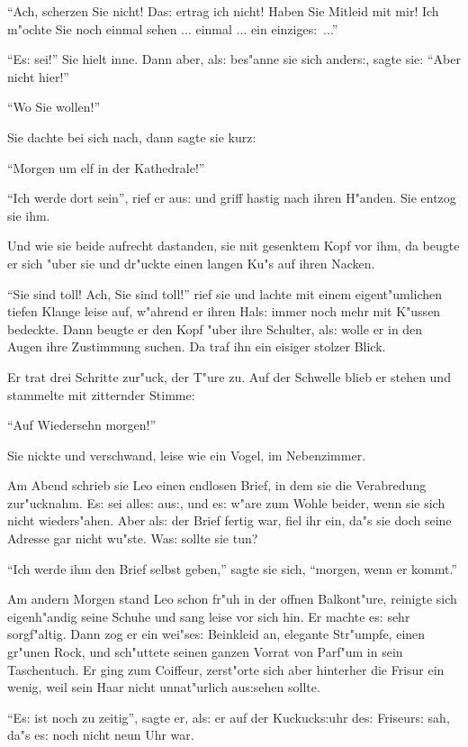 \documentclass[oneside,12pt]{book}
\newcommand{\s}{s:}%
\begin{document}
"`Ach, scherzen Sie nicht! Da{\s} ertrag ich nicht! Haben Sie
Mitleid mit mir! Ich m"ochte Sie noch einmal sehen ... einmal ...
ein einzige{\s}~..."'

"`E{\s} sei!"' Sie hielt inne. Dann aber, al{\s} bes"anne sie sich
ander{\s}, sagte sie: "`Aber nicht hier!"'

"`Wo Sie wollen!"'

Sie dachte bei sich nach, dann sagte sie kurz:

"`Morgen um elf in der Kathedrale!"'

"`Ich werde dort sein"', rief er au{\s} und griff hastig nach
ihren H"anden. Sie ent\/zog sie ihm.

Und wie sie beide aufrecht dastanden, sie mit gesenktem Kopf vor
ihm, da beugte er sich "uber sie und dr"uckte einen langen Ku"s
auf ihren Nacken.

"`Sie sind toll! Ach, Sie sind toll!"' rief sie und lachte mit
einem eigent"umlichen tiefen Klange leise auf, w"ahrend er ihren
Hal{\s} immer noch mehr mit K"ussen bedeckte. Dann beugte er den
Kopf "uber ihre Schulter, al{\s} wolle er in den Augen ihre
Zustimmung suchen. Da traf ihn ein eisiger stolzer Blick.

Er trat drei Schritte zur"uck, der T"ure zu. Auf der Schwelle
blieb er stehen und stammelte mit zitternder Stimme:

"`Auf Wiedersehn morgen!"'

Sie nickte und verschwand, leise wie ein Vogel, im Nebenzimmer.

Am Abend schrieb sie Leo einen endlosen Brief, in dem sie die
Verabredung zur"ucknahm. E{\s} sei alle{\s} au{\s}, und e{\s}
w"are zum Wohle beider, wenn sie sich nicht wieders"ahen. Aber
al{\s} der Brief fertig war, fiel ihr ein, da"s sie doch seine
Adresse gar nicht wu"ste. Wa{\s} sollte sie tun?

"`Ich werde ihm den Brief selbst geben,"' sagte sie sich,
"`morgen, wenn er kommt."'

Am andern Morgen stand Leo schon fr"uh in der offnen Balkont"ure,
reinigte sich eigenh"andig seine Schuhe und sang leise vor sich
hin. Er machte e{\s} sehr sorgf"altig. Dann zog er ein wei"se{\s}
Beinkleid an, elegante Str"umpfe, einen gr"unen Rock, und
sch"uttete seinen ganzen Vorrat von Parf"um in sein Taschentuch.
Er ging zum Coiffeur, zerst"orte sich aber hinterher die Frisur
ein wenig, weil sein Haar nicht unnat"urlich au{\s}sehen sollte.

"`E{\s} ist noch zu zeitig"', sagte er, al{\s} er auf der
Kuckuck{\s}uhr de{\s} Friseur{\s} sah, da"s e{\s} noch nicht neun
Uhr war.
\end{document}
